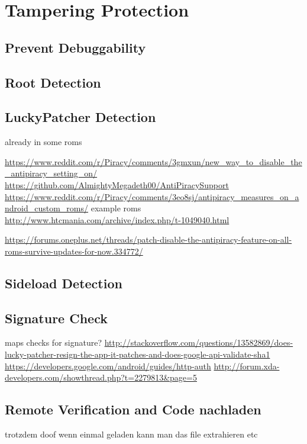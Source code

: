\section{Tampering Protection} \label{section:tampering}

\subsection{Prevent Debuggability} \label{subsection:tampering-debuggable}
\subsection{Root Detection} \label{subsection:tampering-root}
\subsection{LuckyPatcher Detection} \label{subsection:tampering-luckypatcher}
already in some roms

 \url{https://www.reddit.com/r/Piracy/comments/3gmxun/new_way_to_disable_the_antipiracy_setting_on/}\newline
\url{https://github.com/AlmightyMegadeth00/AntiPiracySupport}\newline
\url{https://www.reddit.com/r/Piracy/comments/3eo8sj/antipiracy_measures_on_android_custom_roms/}\newline
example roms \url{http://www.htcmania.com/archive/index.php/t-1049040.html}\newline

\url{https://forums.oneplus.net/threads/patch-disable-the-antipiracy-feature-on-all-roms-survive-updates-for-now.334772/}
\subsection{Sideload Detection} \label{subsection:tampering-sideload}
\subsection{Signature Check} \label{subsection:tampering-signature}
maps checks for signature?\newline
\url{http://stackoverflow.com/questions/13582869/does-lucky-patcher-resign-the-app-it-patches-and-does-google-api-validate-sha1}\newline
\url{https://developers.google.com/android/guides/http-auth}
\url{http://forum.xda-developers.com/showthread.php?t=2279813&page=5}\newline
\subsection{Remote Verification and Code nachladen} \label{subsection:external-remote}
trotzdem doof wenn einmal geladen kann man das file extrahieren etc
